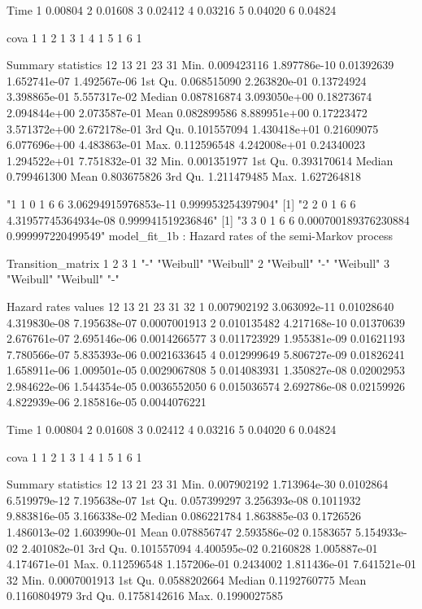 \documentclass[11pt,a4paper]{article}
\begin{document}
\begin{enumerate}
\begin{Schunk}
\begin{Soutput}
     Time
1 0.00804
2 0.01608
3 0.02412
4 0.03216
5 0.04020
6 0.04824

  cova
1    1
2    1
3    1
4    1
5    1
6    1

Summary statistics
                 12           13         21           23           31
Min.    0.009423116 1.897786e-10 0.01392639 1.652741e-07 1.492567e-06
1st Qu. 0.068515090 2.263820e-01 0.13724924 3.398865e-01 5.557317e-02
Median  0.087816874 3.093050e+00 0.18273674 2.094844e+00 2.073587e-01
Mean    0.082899586 8.889951e+00 0.17223472 3.571372e+00 2.672178e-01
3rd Qu. 0.101557094 1.430418e+01 0.21609075 6.077696e+00 4.483863e-01
Max.    0.112596548 4.242008e+01 0.24340023 1.294522e+01 7.751832e-01
                 32
Min.    0.001351977
1st Qu. 0.393170614
Median  0.799461300
Mean    0.803675826
3rd Qu. 1.211479485
Max.    1.627264818
\end{Soutput}
\begin{Soutput}
[1] "1 1 0 1 6 6 3.06294915976853e-11 0.999953254397904"
[1] "2 2 0 1 6 6 4.31957745364934e-08 0.999941519236846"
[1] "3 3 0 1 6 6 0.000700189376230884 0.999997220499549"
model_fit_1b  : Hazard rates of the semi-Markov process

Transition_matrix
  1         2         3        
1 "-"       "Weibull" "Weibull"
2 "Weibull" "-"       "Weibull"
3 "Weibull" "Weibull" "-"      

Hazard rates values 
           12           13         21           23           31           32
1 0.007902192 3.063092e-11 0.01028640 4.319830e-08 7.195638e-07 0.0007001913
2 0.010135482 4.217168e-10 0.01370639 2.676761e-07 2.695146e-06 0.0014266577
3 0.011723929 1.955381e-09 0.01621193 7.780566e-07 5.835393e-06 0.0021633645
4 0.012999649 5.806727e-09 0.01826241 1.658911e-06 1.009501e-05 0.0029067808
5 0.014083931 1.350827e-08 0.02002953 2.984622e-06 1.544354e-05 0.0036552050
6 0.015036574 2.692786e-08 0.02159926 4.822939e-06 2.185816e-05 0.0044076221

     Time
1 0.00804
2 0.01608
3 0.02412
4 0.03216
5 0.04020
6 0.04824

  cova
1    1
2    1
3    1
4    1
5    1
6    1

Summary statistics
                 12           13        21           23           31
Min.    0.007902192 1.713964e-30 0.0102864 6.519979e-12 7.195638e-07
1st Qu. 0.057399297 3.256393e-08 0.1011932 9.883816e-05 3.166338e-02
Median  0.086221784 1.863885e-03 0.1726526 1.486013e-02 1.603990e-01
Mean    0.078856747 2.593586e-02 0.1583657 5.154933e-02 2.401082e-01
3rd Qu. 0.101557094 4.400595e-02 0.2160828 1.005887e-01 4.174671e-01
Max.    0.112596548 1.157206e-01 0.2434002 1.811436e-01 7.641521e-01
                  32
Min.    0.0007001913
1st Qu. 0.0588202664
Median  0.1192760775
Mean    0.1160804979
3rd Qu. 0.1758142616
Max.    0.1990027585
\end{Soutput}
\end{Schunk}


\end{enumerate}
\end{document}
